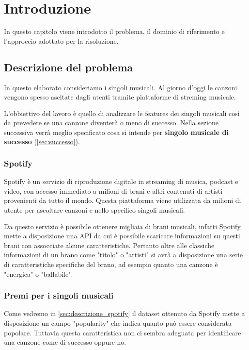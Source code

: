 \chapter{Introduzione}

In questo capitolo viene introdotto il problema, il dominio di riferimento e l'approccio adottato per la risoluzione.

\section{Descrizione del problema}
In questo elaborato consideriamo i singoli musicali. Al giorno d'oggi le canzoni vengono spesso ascltate dagli utenti tramite piattaforme di streming musicale.

L'obbiettivo del lavoro è quello di analizzare le features dei singoli musicali così da prevedere se una canzone diventerà o meno di successo. Nella sezione successiva verrà meglio specificato cosa si intende per \textbf{singolo musicale di successo} (\autoref{sec:successo}).

\subsection{Spotify}
Spotify è un servizio di riproduzione digitale in streaming di musica, podcast e video, con accesso immediato a milioni di brani e altri contenuti di artisti provenienti da tutto il mondo. Questa piattaforma viene utilizzata da milioni di utente per ascoltare canzoni e nello specifico singoli musicali.

Da questo servizio è possibile ottenere migliaia di brani musicali, infatti Spotify mette a disposizione una API da cui è possibile scaricare informazioni su questi brani con assocciate alcune caratteristiche. Pertanto oltre alle classiche informazioni di un brano come "titolo" o "artisti" si avrà a disposizione una serie di caratteristiche specifiche del brano, ad esempio quanto una canzone è "energica" o "ballabile".


\subsection{Premi per i singoli musicali}
\label{sec:successo}

Come vedremo in \autoref{sec:descrizione_spotify} il dataset ottenuto da Spotify mette a disposizione un campo "popularity" che indica quanto può essere considerata popolare. Tuttavia questa caratteristica non ci sembra adeguata per identificare una canzone come di successo oppure no.


